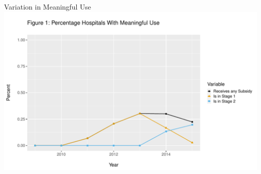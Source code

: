 \documentclass[10pt]{beamer}
\begin{document}
\begin{frame}{Variation in Meaningful Use}
    \centering
    \includegraphics[scale=.5]{Objects/TYP_plot_hospmeanuse_year.pdf}
\end{frame}
\end{document}
